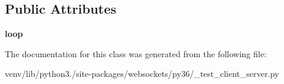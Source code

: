 \subsection*{Public Attributes}
\begin{DoxyCompactItemize}
\item 
\mbox{\label{classwebsockets_1_1py36_1_1__test__client__server_1_1_async_iterator_tests_acf8f944312537be2065e1b413c0ebcc4}} 
{\bfseries loop}
\end{DoxyCompactItemize}


The documentation for this class was generated from the following file\+:\begin{DoxyCompactItemize}
\item 
venv/lib/python3./site-\/packages/websockets/py36/\+\_\+test\+\_\+client\+\_\+server.\+py\end{DoxyCompactItemize}
